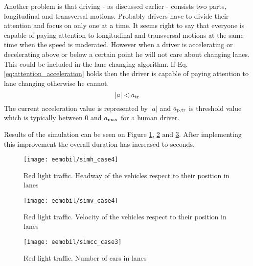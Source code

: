 		 Another problem is that driving - as discussed earlier - consists two parts, longitudinal and transversal motions. Probably drivers have to divide their attention and focus on only one at a time. It seems right to say that everyone is capable of paying attention to longitudinal and transversal motions at the same time when the speed is moderated. However when a driver is accelerating or decelerating above or below a certain point he will not care about changing lanes. This could be included in the lane changing algorithm. If Eq. \eqref{eq:attention_acceleration} holds then the driver is capable of paying attention to lane changing otherwise he cannot.
		\begin{equation}
			|a|<a_{\rm tr}
			\label{eq:attention_acceleration}
		\end{equation}
		The current acceleration value is represented by $|a|$ and $a_{\rm p,tr}$ is threshold value which is typically between 0 and $a_{\rm max}$ for a human driver.
		
		Results of the simulation can be seen on Figure \ref{fig:red_light_situationh_impr3}, \ref{fig:red_light_situationv_impr3} and \ref{fig:red_light_situationcc_impr3}. After implementing this improvement the overall duration has increased to seconds.
		\begin{figure}
			\centering
			\texttt{[image: eemobil/simh\_case4]}
			\caption{Red light traffic. Headway of the vehicles respect to their position in lanes}
			\label{fig:red_light_situationh_impr3}
		\end{figure}
		\begin{figure}
			\centering
			\texttt{[image: eemobil/simv\_case4]}
			\caption{Red light traffic. Velocity of the vehicles respect to their position in lanes}
			\label{fig:red_light_situationv_impr3}
		\end{figure}
		\begin{figure}
			\centering
			\texttt{[image: eemobil/simcc\_case3]}
			\caption{Red light traffic. Number of cars in lanes }
			\label{fig:red_light_situationcc_impr3}
		\end{figure}